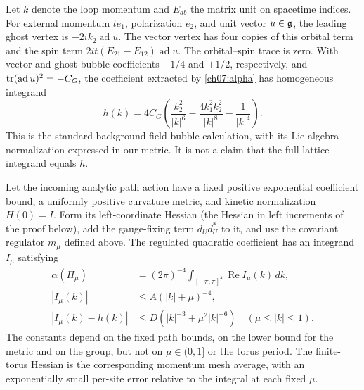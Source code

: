 Let $k$ denote the loop momentum and $E_{ab}$ the matrix unit on
spacetime indices. For external momentum $te_1$, polarization $e_2$,
and unit vector $u\in\mathfrak g$, the leading ghost vertex is
$-2ik_2\operatorname{ad}u$. The vector
vertex has four copies of this orbital term and the spin term
$2it(E_{21}-E_{12})\operatorname{ad}u$. The orbital--spin trace is zero.
With vector and ghost bubble coefficients $-1/4$ and $+1/2$, respectively,
and $\operatorname{tr}(\operatorname{ad}u)^2=-C_G$, the coefficient extracted by
\eqref{ch07:alpha} has homogeneous integrand
\begin{equation}\label{ch07:pole}
 h(k)=4C_G\left(\frac{k_2^2}{|k|^6}
       -\frac{4k_1^2k_2^2}{|k|^8}-\frac1{|k|^4}\right).
\end{equation}
This is the standard background-field bubble calculation, with its
Lie algebra normalization expressed in our metric. It is not a claim that
the full lattice integrand equals $h$.

\begin{proposition}\label{ch07:integrand-input}
Let the incoming analytic path action have a fixed positive exponential
coefficient bound, a uniformly positive curvature metric, and kinetic
normalization $H(0)=I$. Form its left-coordinate Hessian (the Hessian in left increments of the proof below), add
the gauge-fixing term $d_Ud_U^*$ to it, and use the covariant regulator $m_\mu$ defined above.
The regulated quadratic coefficient has an integrand $I_\mu$ satisfying
\begin{align*}
 \alpha(\Pi_\mu)&=(2\pi)^{-4}\int_{[-\pi,\pi]^4}
                                    \operatorname{Re}I_\mu(k)\,dk,\\
 |I_\mu(k)|&\le A(|k|+\mu)^{-4},\\
 |I_\mu(k)-h(k)|&\le D(|k|^{-3}+\mu^2|k|^{-6})
                  \quad(\mu\le|k|\le1).
\end{align*}
The constants depend on the fixed path bounds, on the lower bound for the metric and on the group,
but not on $\mu\in(0,1]$ or the torus period. The finite-torus Hessian
is the corresponding momentum mesh average, with an exponentially small
per-site error relative to the integral at each fixed $\mu$.
\end{proposition}

